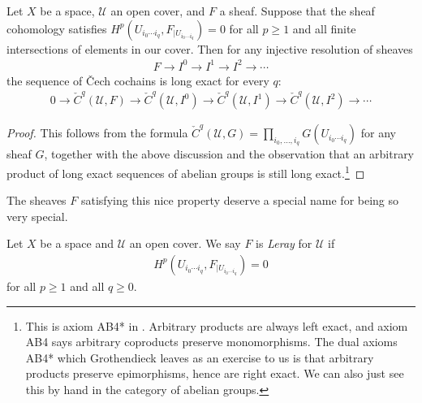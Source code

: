 \documentclass[11pt]{book}
\begin{document}
\begin{proposition} Let $X$ be a space, $\mathcal{U}$ an open cover, and $F$ a sheaf. Suppose that the sheaf cohomology satisfies $H^p(U_{i_0 \cdots i_q}, F_{|U_{i_0 \cdots i_q}}) = 0$ for all $p\ge1$ and all finite intersections of elements in our cover. Then for any injective resolution of sheaves
\begin{align*}
    F \to I^0 \to I^1 \to I^2 \to \cdots
\end{align*}
the sequence of \v{C}ech cochains is long exact for every $q$:
\begin{equation}\label{eqn:LES-cech-cochains-leray-cover}
\begin{aligned}
    0 \to \check{C}^q(\mathcal{U},F) \to \check{C}^q(\mathcal{U},I^0) \to \check{C}^q(\mathcal{U},I^1) \to \check{C}^q(\mathcal{U},I^2) \to \cdots
\end{aligned}
\end{equation}
\end{proposition}
\begin{proof} This follows from the formula $\check{C}^q(\mathcal{U},G) = \prod_{i_0, \ldots, i_q} G(U_{i_0 \cdots i_q})$ for any sheaf $G$, together with the above discussion and the observation that an arbitrary product of long exact sequences of abelian groups is still long exact.\footnote{ This is axiom AB4* in \cite{Tohoku}. Arbitrary products are always left exact, and axiom AB4 says arbitrary coproducts preserve monomorphisms. The dual axioms AB4* which Grothendieck leaves as an exercise to us is that arbitrary products preserve epimorphisms, hence are right exact. We can also just see this by hand in the category of abelian groups.}
\end{proof}

The sheaves $F$ satisfying this nice property deserve a special name for being so very special.

\begin{definition}\label{def:Leray-cover} Let $X$ be a space and $\mathcal{U}$ an open cover.
We say $F$ is \emph{Leray} for $\mathcal{U}$ if
\begin{align*}
    H^p(U_{i_0 \cdots i_q},F_{|U_{i_0 \cdots i_q}}) =0
\end{align*}
for all $p\ge1$ and all $q\ge0$.
\end{definition}
\end{document}
